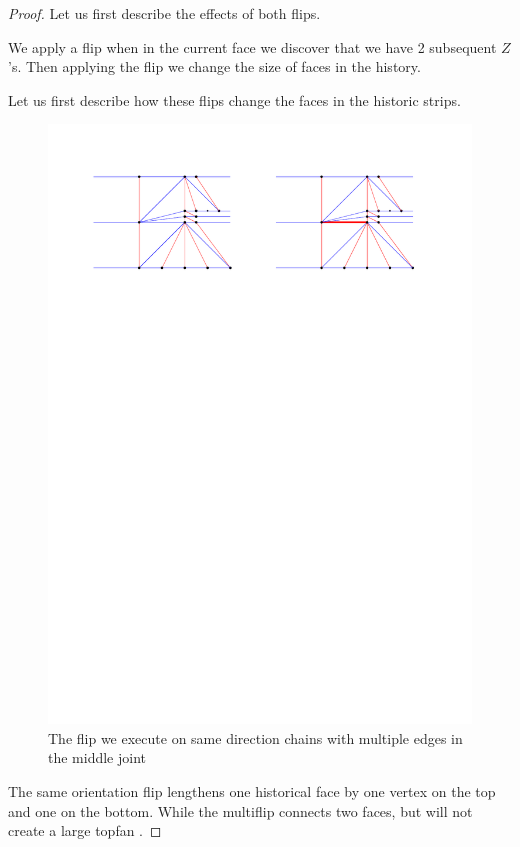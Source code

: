   \begin{proof}
    Let us first describe the effects of both flips.

    We apply a flip when in the current face we discover that we have 2 subsequent $Z$'s. Then applying the flip we change the size of faces in the history. 

    Let us first describe how these flips change the faces in the historic strips.
  \begin{figure}[h]
    \centering
    \includegraphics[width =\textwidth]{unifiedAlgo/img/post/sameMultiFlip}
    \caption{The flip we execute on same direction chains with multiple edges in the middle joint}
    \label{fig:uni:sameMultiFlip}
  \end{figure}
    The same orientation flip lengthens one historical face by one vertex on the top and one on the bottom. While the multiflip connects two faces, but will not create a large topfan .


\end{proof}
